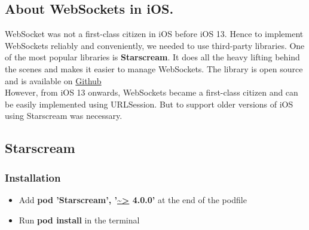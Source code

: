 \documentclass[12pt, conference, a4paper]{article}
\begin{document}
\subsection{About WebSockets in iOS.}
WebSocket was not a first-class citizen in iOS before iOS 13. Hence to implement WebSockets reliably and conveniently, we needed to use third-party libraries. One of the most popular libraries is \textbf{Starscream}. It does all the heavy lifting behind the scenes and makes it easier to manage WebSockets. The library is open source and is available on \href{https://github.com/daltoniam/Starscream}{Github}\\
However, from iOS 13 onwards, WebSockets became a first-class citizen and can be easily implemented using URLSession. 
But to support older versions of iOS using Starscream was necessary.
\subsection{Starscream}
\subsubsection{Installation}
\begin{itemize}
  \item Add \textbf{pod 'Starscream', '\url{~>} 4.0.0'} at the end of the podfile
  \item Run \textbf{pod install} in the terminal
\end{itemize}
\end{document}
